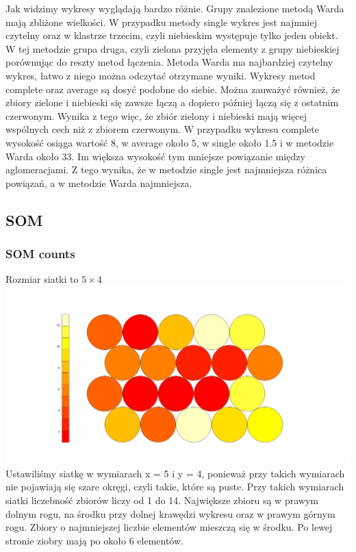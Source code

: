\documentclass{article}
\begin{document}
        Jak widzimy wykresy wyglądają bardzo różnie. Grupy znalezione metodą Warda mają zbliżone wielkości. W przypadku metody single  wykres 
        jest najmniej czytelny oraz w klastrze trzecim, czyli niebieskim występuje tylko jeden obiekt. W tej metodzie grupa druga, czyli zielona 
        przyjęła elementy z grupy niebieskiej porównując do reszty metod łączenia. Metoda Warda ma najbardziej czytelny wykres, łatwo z niego 
        można odczytać otrzymane wyniki. Wykresy metod complete oraz average są dosyć podobne do siebie. 
        Można zauważyć również, że zbiory zielone i niebieski się zawsze łączą a dopiero później łączą się z ostatnim czerwonym. Wynika z tego 
        więc, że zbiór zielony i niebieski mają więcej wspólnych cech niż z zbiorem czerwonym. W przypadku wykresu complete wysokość osiąga 
        wartość 8, w average około 5, w single około 1.5 i w metodzie Warda około 33. Im większa wysokość tym mniejsze powiązanie między 
        aglomeracjami. Z tego wynika, że w metodzie single jest najmniejsza różnica powiązań, a w metodzie Warda najmniejsza.


    \subsection{SOM}
        \subsubsection{SOM counts}    
            Rozmiar siatki to $5\times4$
            \newline
            \includegraphics[width = \textwidth]{som_counts_fig.jpeg}
            Ustawiliśmy siatkę w wymiarach x = 5 i y = 4, ponieważ przy takich wymiarach nie pojawiają się 
            szare okręgi, czyli takie, które są puste. Przy takich wymiarach siatki liczebność zbiorów liczy od 1 do 14. 
            Największe zbioru są w prawym dolnym rogu, na środku przy dolnej krawędzi wykresu oraz w prawym górnym rogu. 
            Zbiory o najmniejszej liczbie elementów mieszczą się w środku. Po lewej stronie ziobry mają po około 6 elementów.
\end{document}
